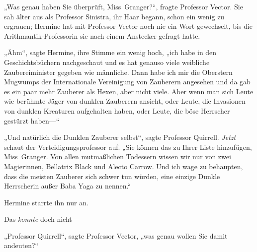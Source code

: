 „Was genau haben Sie überprüft, Miss~Granger?“, fragte Professor Vector. Sie sah älter aus als Professor Sinistra, ihr Haar begann, schon ein wenig zu ergrauen; Hermine hat mit Professor Vector noch nie ein Wort gewechselt, bis die Arithmantik-Professorin sie nach einem Anstecker gefragt hatte.

„Ähm“, sagte Hermine, ihre Stimme ein wenig hoch, „ich habe in den Geschichtsbüchern nachgeschaut und es hat genauso viele weibliche Zaubereiminister gegeben wie männliche. Dann habe ich mir die Oberstern Mugwumps der Internationale Vereinigung von Zauberern angesehen und da gab es ein paar mehr Zauberer als Hexen, aber nicht viele. Aber wenn man sich Leute wie berühmte Jäger von dunklen Zauberern ansieht, oder Leute, die Invasionen von dunklen Kreaturen aufgehalten haben, oder Leute, die böse Herrscher gestürzt haben—“

„Und natürlich die Dunklen Zauberer selbst“, sagte Professor Quirrell. \emph{Jetzt} schaut der Verteidigungsprofessor auf. „Sie können das zu Ihrer Liste hinzufügen, Miss~Granger. Von allen mutmaßlichen Todessern wissen wir nur von zwei Magierinnen, Bellatrix Black und Alecto Carrow. Und ich wage zu behaupten, dass die meisten Zauberer sich schwer tun würden, eine einzige Dunkle Herrscherin außer Baba Yaga zu nennen.“

Hermine starrte ihn nur an.

Das \emph{konnte} doch nicht—

„Professor Quirrell“, sagte Professor Vector, „was genau wollen Sie damit andeuten?“

